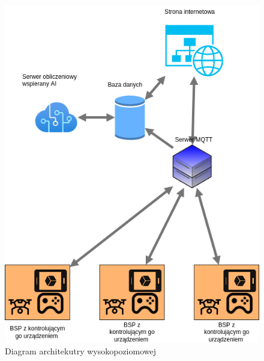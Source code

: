 \begin{figure}[H]
\begin{center}
  \includegraphics[width=12cm]{./Obrazy/highlevel.png}
  \caption{Diagram architekutry wysokopoziomowej}
\end{center}
\end{figure}

\newpage
